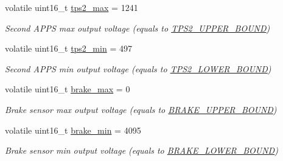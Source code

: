 \begin{DoxyCompactItemize}
volatile uint16\+\_\+t \mbox{\hyperlink{group___board__model__group_ga53381436ea8db96c356db8b305bec988}{tps2\+\_\+max}} = 1241
\begin{DoxyCompactList}\small\item\em Second A\+P\+PS max output voltage (equals to \mbox{\hyperlink{group___board__model__group_gac8be8d89c699c40b79d04c0fdf6238f4}{T\+P\+S2\+\_\+\+U\+P\+P\+E\+R\+\_\+\+B\+O\+U\+ND}}) \end{DoxyCompactList}\item 
\mbox{\label{group___board__model__group_ga4e7715668b19738d8bfd47f2420aff02}} 
volatile uint16\+\_\+t \mbox{\hyperlink{group___board__model__group_ga4e7715668b19738d8bfd47f2420aff02}{tps2\+\_\+min}} = 497
\begin{DoxyCompactList}\small\item\em Second A\+P\+PS min output voltage (equals to \mbox{\hyperlink{group___board__model__group_gadfcc723e175ac44e73e38407299ac875}{T\+P\+S2\+\_\+\+L\+O\+W\+E\+R\+\_\+\+B\+O\+U\+ND}}) \end{DoxyCompactList}\item 
\mbox{\label{group___board__model__group_ga744857a9bc060647cfc4ad47017c5bee}} 
volatile uint16\+\_\+t \mbox{\hyperlink{group___board__model__group_ga744857a9bc060647cfc4ad47017c5bee}{brake\+\_\+max}} = 0
\begin{DoxyCompactList}\small\item\em Brake sensor max output voltage (equals to \mbox{\hyperlink{group___board__model__group_ga891de03ab9e1bd9a92ffffe69a1b10ca}{B\+R\+A\+K\+E\+\_\+\+U\+P\+P\+E\+R\+\_\+\+B\+O\+U\+ND}}) \end{DoxyCompactList}\item 
\mbox{\label{group___board__model__group_ga779ee9b904930e3cfb165e70edfecd02}} 
volatile uint16\+\_\+t \mbox{\hyperlink{group___board__model__group_ga779ee9b904930e3cfb165e70edfecd02}{brake\+\_\+min}} = 4095
\begin{DoxyCompactList}\small\item\em Brake sensor min output voltage (equals to \mbox{\hyperlink{group___board__model__group_ga0aed20cafcc206360abda47b125432c7}{B\+R\+A\+K\+E\+\_\+\+L\+O\+W\+E\+R\+\_\+\+B\+O\+U\+ND}}) \end{DoxyCompactList}\item 
\mbox{\label{group___board__model__group_gad2658b77f345b15c03759c02d1ba0e81}} 

\end{DoxyCompactItemize}
